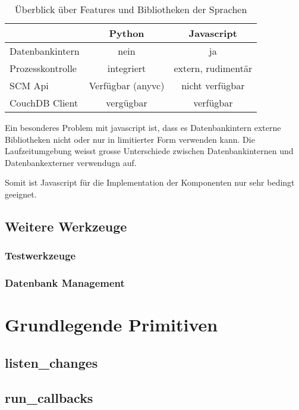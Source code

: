 \begin{table}[ht]
\centering
\begin{tabular}{l|c|c}
                            & \textbf{Python}   & \textbf{Javascript} \\
    \hline
    Datenbankintern         & nein              & ja \\
    Prozesskontrolle        & integriert        & extern, rudiment\"ar \\
    SCM Api                 & Verf\"ugbar (anyvc)& nicht verf\"ugbar \\
    CouchDB Client          & verg\"ugbar       & verf\"ugbar \\
\end{tabular}
\caption{\"Uberblick \"uber Features und Bibliotheken der Sprachen}
\label{tab:python-vs-js}
\end{table}

Ein besonderes Problem mit javascript ist,
dass es Datenbankintern externe Bibliotheken nicht
oder nur in limitierter Form verwenden kann.
Die Laufzeitumgebung weisst grosse Unterschiede
zwischen Datenbankinternen und Datenbankexterner verwendugn auf.

Somit ist Javascript f\"ur die Implementation der Komponenten nur sehr bedingt geeignet.

\subsection{Weitere Werkzeuge}

\subsubsection{Testwerkzeuge}
\subsubsection{Datenbank Management}

\section{Grundlegende Primitiven}

\subsection{listen\_changes}

\subsection{run\_callbacks}

